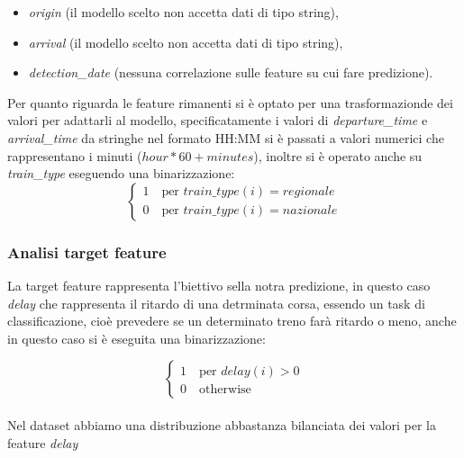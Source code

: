 \documentclass[italian,12pt,a4paper]{article}
\begin{document}
			\begin{itemize}
				\item \textit{origin} (il modello scelto non accetta dati di tipo string),
				\item \textit{arrival} (il modello scelto non accetta dati di tipo string),
				\item \textit{detection\_date} (nessuna correlazione sulle feature su cui fare predizione).
			\end{itemize}
			Per quanto riguarda le feature rimanenti si è optato per una trasformazionde dei valori per adattarli al modello, specificatamente i valori di \textit{departure\_time} e \textit{arrival\_time} da stringhe nel formato HH:MM si è passati a valori numerici che rappresentano i minuti ($hour*60+minutes$), inoltre si è operato anche su \textit{train\_type} eseguendo una binarizzazione:
			\begin{equation*}
				\begin{cases}
					1 \quad \text{per } train\_type(i) = regionale \\
					0 \quad \text{per } train\_type(i) = nazionale
				\end{cases}
			\end{equation*}
			
		\subsubsection{Analisi target feature}
			La target feature rappresenta l'biettivo sella notra predizione, in questo caso \textit{delay} che rappresenta il ritardo di una detrminata corsa, essendo un task di classificazione, cioè prevedere se un determinato treno farà ritardo o meno, anche in questo caso si è eseguita una binarizzazione:
			
			\begin{equation*}
				\begin{cases}
					1 \quad \text{per } delay(i) > 0  \\
					0 \quad \text{otherwise}
				\end{cases}
			\end{equation*}
			\linebreak
			\\
			Nel dataset abbiamo una distribuzione abbastanza bilanciata dei valori per la feature \textit{delay}
			
\end{document}
